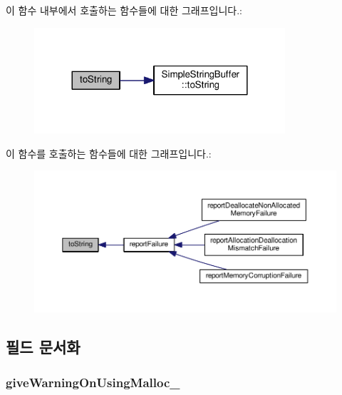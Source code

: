 이 함수 내부에서 호출하는 함수들에 대한 그래프입니다.\+:
\nopagebreak
\begin{figure}[H]
\begin{center}
\leavevmode
\includegraphics[width=264pt]{class_memory_leak_output_string_buffer_ac4969471df03a7a438bd99bfe61a0d5e_cgraph}
\end{center}
\end{figure}




이 함수를 호출하는 함수들에 대한 그래프입니다.\+:
\nopagebreak
\begin{figure}[H]
\begin{center}
\leavevmode
\includegraphics[width=350pt]{class_memory_leak_output_string_buffer_ac4969471df03a7a438bd99bfe61a0d5e_icgraph}
\end{center}
\end{figure}




\subsection{필드 문서화}
\subsubsection[{\texorpdfstring{give\+Warning\+On\+Using\+Malloc\+\_\+}{giveWarningOnUsingMalloc_}}]{ give\+Warning\+On\+Using\+Malloc\+\_\+\hspace{0.3cm}{\ttfamily [private]}}\hypertarget{class_memory_leak_output_string_buffer_a04fdc0c69ccd96059de5757ca5e45388}{}\label{class_memory_leak_output_string_buffer_a04fdc0c69ccd96059de5757ca5e45388}



